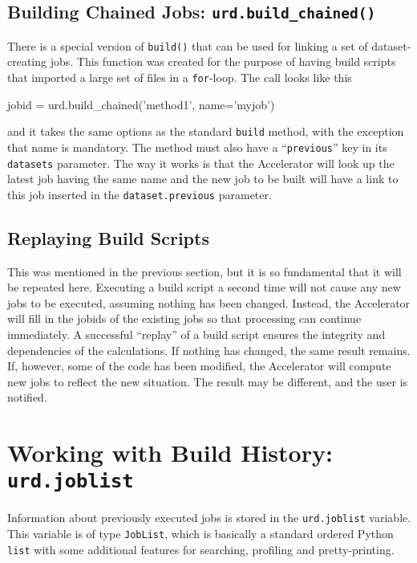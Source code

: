 \subsection{Building Chained Jobs: \texttt{urd.build\_chained()}}
There is a special version of \texttt{build()} that can be used for
linking a set of dataset-creating jobs.  This function was created for
the purpose of having build scripts that imported a large set of files
in a \texttt{for}-loop.  The call looks like this
\begin{python}
jobid = urd.build_chained('method1', name='myjob')
\end{python}
and it takes the same options as the standard \texttt{build} method,
with the exception that name is mandatory.  The method must also have
a ``\texttt{previous}'' key in its \texttt{datasets} parameter.  The
way it works is that the Accelerator will look up the latest job
having the same name and the new job to be built will have a link to
this job inserted in the \texttt{dataset.previous} parameter.



\subsection{Replaying Build Scripts}
This was mentioned in the previous section, but it is so fundamental
that it will be repeated here.  Executing a build script a second time
will not cause any new jobs to be executed, assuming nothing has been
changed.  Instead, the Accelerator will fill in the jobids of the
existing jobs so that processing can continue immediately.  A
successful ``replay'' of a build script ensures the integrity and
dependencies of the calculations.  If nothing has changed, the same
result remains.  If, however, some of the code has been modified, the
Accelerator will compute new jobs to reflect the new situation.  The
result may be different, and the user is notified.




\section{Working with Build History:  \texttt{urd.joblist}}
\label{sec:joblist}

Information about previously executed jobs is stored in
the \texttt{urd.joblist} variable.  This variable is of
type \texttt{JobList}, which is basically a standard ordered
Python \texttt{list} with some additional features for searching,
profiling and pretty-printing.




